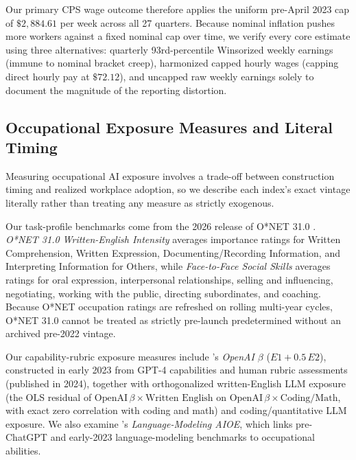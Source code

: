 \documentclass[11pt]{amsart}
\begin{document}
Our primary CPS wage outcome therefore applies the uniform pre-April 2023 cap of $\$2{,}884.61$ per week across all 27 quarters. Because nominal inflation pushes more workers against a fixed nominal cap over time, we verify every core estimate using three alternatives: quarterly 93rd-percentile Winsorized weekly earnings (immune to nominal bracket creep), harmonized capped hourly wages (capping direct hourly pay at $\$72.12$), and uncapped raw weekly earnings solely to document the magnitude of the reporting distortion.

\subsection{Occupational Exposure Measures and Literal Timing}

Measuring occupational AI exposure involves a trade-off between construction timing and realized workplace adoption, so we describe each index's exact vintage literally rather than treating any measure as strictly exogenous.

Our task-profile benchmarks come from the 2026 release of O*NET 31.0 \citep{ONET2026}. \emph{O*NET 31.0 Written-English Intensity} averages importance ratings for Written Comprehension, Written Expression, Documenting/Recording Information, and Interpreting Information for Others, while \emph{Face-to-Face Social Skills} \citep{Deming2017} averages ratings for oral expression, interpersonal relationships, selling and influencing, negotiating, working with the public, directing subordinates, and coaching. Because O*NET occupation ratings are refreshed on rolling multi-year cycles, O*NET 31.0 cannot be treated as strictly pre-launch predetermined without an archived pre-2022 vintage.

Our capability-rubric exposure measures include \citet{Eloundou2024}'s \emph{OpenAI $\beta$} ($E1 + 0.5\,E2$), constructed in early 2023 from GPT-4 capabilities and human rubric assessments (published in 2024), together with orthogonalized written-English LLM exposure (the OLS residual of $\text{OpenAI}\,\beta \times \text{Written English}$ on $\text{OpenAI}\,\beta \times \text{Coding/Math}$, with exact zero correlation with coding and math) and coding/quantitative LLM exposure. We also examine \citet{Felten2021, Felten2023}'s \emph{Language-Modeling AIOE}, which links pre-ChatGPT and early-2023 language-modeling benchmarks to occupational abilities.
\end{document}
